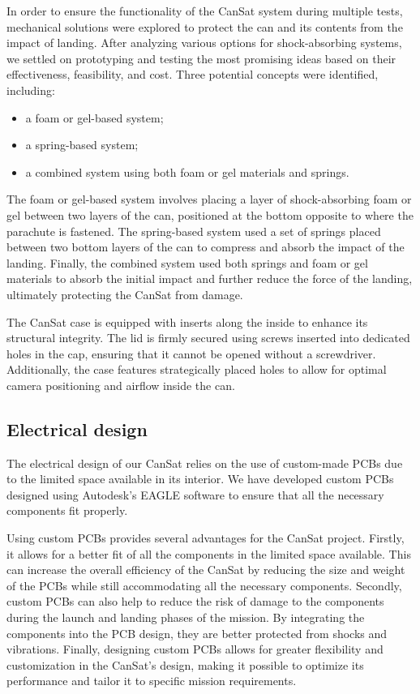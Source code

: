 \documentclass[11pt]{article}
\begin{document}
In order to ensure the functionality of the CanSat system during multiple tests, mechanical solutions were explored to protect the can and its contents from the impact of landing. After analyzing various options for shock-absorbing systems, we settled on prototyping and testing the most promising ideas based on their effectiveness, feasibility, and cost. Three potential concepts were identified, including:
\begin{itemize}[leftmargin=1cm,itemindent=0.5cm, noitemsep, topsep=0pt, label=$\bullet$]
    \item a foam or gel-based system;
    \item a spring-based system;
    \item a combined system using both foam or gel materials and springs.
\end{itemize}

The foam or gel-based system involves placing a layer of shock-absorbing foam or gel between two layers of the can, positioned at the bottom opposite to where the parachute is fastened. The spring-based system used a set of springs placed between two bottom layers of the can to compress and absorb the impact of the landing. Finally, the combined system used both springs and foam or gel materials to absorb the initial impact and further reduce the force of the landing, ultimately protecting the CanSat from damage.

The CanSat case is equipped with inserts along the inside to enhance its structural integrity. The lid is firmly secured using screws inserted into dedicated holes in the cap, ensuring that it cannot be opened without a screwdriver. Additionally, the case features strategically placed holes to allow for optimal camera positioning and airflow inside the can. 


\subsection{Electrical design}

The electrical design of our CanSat relies on the use of custom-made PCBs due to the limited space available in its interior. We have developed custom PCBs designed using Autodesk's EAGLE software to ensure that all the necessary components fit properly. 

Using custom PCBs provides several advantages for the CanSat project. Firstly, it allows for a better fit of all the components in the limited space available. This can increase the overall efficiency of the CanSat by reducing the size and weight of the PCBs while still accommodating all the necessary components. Secondly, custom PCBs can also help to reduce the risk of damage to the components during the launch and landing phases of the mission. By integrating the components into the PCB design, they are better protected from shocks and vibrations. Finally, designing custom PCBs allows for greater flexibility and customization in the CanSat's design, making it possible to optimize its performance and tailor it to specific mission requirements.
\end{document}
